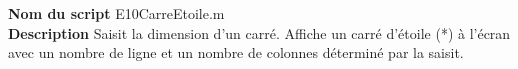 \textbf{Nom du script}
E10CarreEtoile.m\\
\textbf{Description}
Saisit la dimension d'un carré. Affiche un carré d'étoile (*) à l'écran avec un nombre de ligne et un nombre de colonnes déterminé par la saisit.